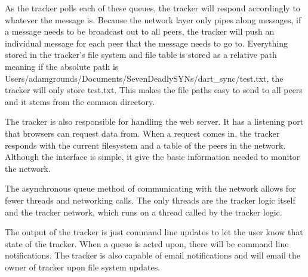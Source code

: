 
As the tracker polls each of these queues, the tracker will respond accordingly to whatever the message is. Because the network layer only pipes along messages, if a message needs to be broadcast out to all peers, the tracker will push an individual message for each peer that the message needs to go to. Everything stored in the tracker’s file system and file table is stored as a relative path meaning if the absolute path is Users/adamgrounds/Documents/SevenDeadlySYNs/dart_sync/test.txt, the tracker will only store test.txt. This makes the file paths easy to send to all peers and it stems from the common directory. 

The tracker is also responsible for handling the web server. It has a listening port that browsers can request data from. When a request comes in, the tracker responds with the current filesystem and a table of the peers in the network. Although the interface is simple, it give the basic information needed to monitor the network. 

The asynchronous queue method of communicating with the network allows for fewer threads and networking calls. The only threads are the tracker logic itself and the tracker network, which runs on a thread called by the tracker logic. 


	
	
	The output of the tracker is just command line updates to let the user know that state of the tracker. When a queue is acted upon, there will be command line notifications. The tracker is also capable of email notifications and will email the owner of tracker upon file system updates.
	
	
